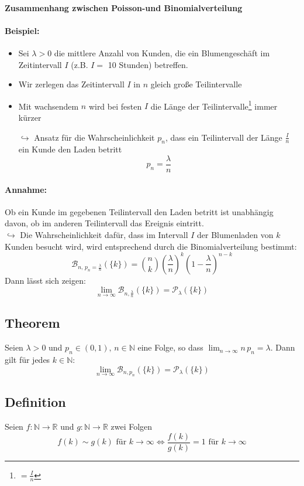 \documentclass[12pt,a4paper]{article}
\begin{document}
 	\paragraph{Zusammenhang zwischen Poisson-und  Binomialverteilung}
 	\paragraph{Beispiel:}
 	\begin{itemize}
 	\item Sei $\lambda>0$ die mittlere Anzahl von Kunden, die ein Blumengeschäft im Zeitintervall $I$ (z.B. $I=$ 10 Stunden) betreffen.
 	\item Wir zerlegen das Zeitintervall $I$ in $n$ gleich große Teilintervalle
 	\item Mit wachsendem $n$ wird bei festen $I$ die Länge der Teilintervalle\footnote{$=\frac{I}{n}$} immer kürzer
 	\item[$\hookrightarrow$] Ansatz für die Wahrscheinlichkeit $p_n$, dass ein Teilintervall der Länge $\frac{I}{n}$ ein Kunde den Laden betritt
 	$$p_n=\frac{\lambda}{n}$$
 	\end{itemize}
 	
 	\paragraph{Annahme:}
 	Ob ein Kunde im gegebenen Teilintervall den Laden betritt ist unabhängig davon, ob im anderen Teilintervall das Ereignis eintritt.\\
 	$\hookrightarrow$ Die Wahrscheinlichkeit dafür, dass im Intervall $I$ der Blumenladen von $k$ Kunden besucht wird, wird entsprechend durch die Binomialverteilung bestimmt:
 	$$\mathcal{B}_{n,\, p_n=\frac{\lambda}{n}}(\{k\})=\binom{n}{k}\left(\frac{\lambda}{n}\right)^k\left(1-\frac{\lambda}{n}\right)^{n-k}$$
 	Dann lässt sich zeigen:
 	$$\lim_{n\to\infty}\mathcal{B}_{n,\frac{\lambda}{n}}(\{k\})=\mathcal{P}_{\lambda}(\{k\})$$
 	
 	\subsection{Theorem}
 	Seien $\lambda>0$ und $p_n\in(0,1),\, n\in\mathbb{N}$ eine Folge, so dass $\lim_{n\to\infty}n\, p_n=\lambda$. Dann gilt für jedes $k\in\mathbb{N}$:
 	$$\lim_{n\to\infty}\mathcal{B}_{n,p_n}(\{k\})=\mathcal{P}_{\lambda}(\{k\})$$
 	\subsection{Definition}
 	Seien $f:\mathbb{N}\to\mathbb{R}$ und $g:\mathbb{N}\to\mathbb{R}$ zwei Folgen 
 	$$f(k)\sim g(k) \text{ für } k\to\infty \Leftrightarrow \frac{f(k)}{g(k)}=1 \text{ für } k\to\infty$$
 	
\end{document}
